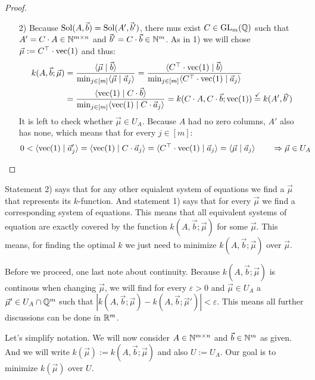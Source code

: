 \begin{proof}
\begin{enumerate}
        \item[2)] Because $\operatorname{Sol}(A, \vec b) = \operatorname{Sol}(A', \vec b')$, there mus exist $C \in \operatorname{GL}_m(\mathbb{Q})$ such that $A' = C \cdot A \in \mathbb{N}^{m \times n}$ and $\vec b' = C \cdot \vec b \in \mathbb{N}^m$. As in 1) we will chose $\vec \mu := C^\top \cdot \operatorname{vec}(1)$ and thus:
        \begin{align*}
            k(A, \vec b; \vec\mu) &= \frac{\langle \vec\mu \mid \vec b \rangle}{\min_{j\in [m]}\langle \vec\mu \mid \vec a_j \rangle} = \frac{\langle C^\top\cdot\operatorname{vec}(1) \mid \vec b \rangle}{\min_{j\in [m]}\langle C^\top\cdot\operatorname{vec}(1) \mid \vec a_j \rangle}\\
            &= \frac{\langle \operatorname{vec}(1) \mid C\cdot\vec b \rangle}{\min_{j\in [m]}\langle \operatorname{vec}(1) \mid C\cdot\vec a_j \rangle} = k(C\cdot A, C\cdot\vec b; \operatorname{vec}(1)) \stackrel{\checkmark}{=} k(A', \vec b')
        \end{align*}
        It is left to check whether $\vec \mu \in U_A$. Because $A$ had no zero columns, $A'$ also has none, which means that for every $j \in [m]$:
        \begin{equation*}
            0 < \langle \operatorname{vec}(1) \mid \vec a'_j \rangle = \langle \operatorname{vec}(1) \mid C \cdot \vec a_j \rangle = \langle C^\top \cdot \operatorname{vec}(1) \mid \vec a_j \rangle = \langle \vec \mu \mid \vec a_j \rangle \qquad \Rightarrow\vec \mu \in U_A \qedhere
        \end{equation*}

    \end{enumerate}
\end{proof}

Statement 2) says that for any other equialent system of equations we find a $\vec \mu$ that represents its $k$-function. And statement 1) says that for every $\vec \mu$ we find a corresponding system of equations. This means that all equivalent systems of equation are exactly covered by the function $k(A, \vec b; \vec\mu)$ for some $\vec \mu$. This means, for finding the optimal $k$ we just need to minimize $k(A, \vec b; \vec \mu)$ over $\vec \mu$.

Before we proceed, one last note about continuity. Because $k(A, \vec b; \vec \mu)$ is continous when changing $\vec\mu$, we will find for every $\varepsilon > 0$ and $\vec\mu \in U_A$ a $\vec\mu' \in U_A \cap \mathbb{Q}^m$ such that $|k(A, \vec b; \vec \mu) - k(A, \vec b; \vec \mu')| < \varepsilon$. This means all further discussions can be done in $\mathbb{R}^m$.

Let's simplify notation. We will now consider $A \in \mathbb{N}^{m \times n}$ and $\vec b \in \mathbb{N}^m$ as given. And we will write $k(\vec \mu) := k(A, \vec b; \vec \mu)$ and also $U := U_A$. Our goal is to minimize $k(\vec \mu)$ over $U$.

